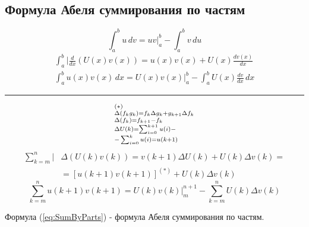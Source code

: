 \documentclass[a4paper,11pt]{article}
\begin{document}
  \subsection {Формула Абеля суммирования по частям}
  \[\int_{a}^{b} u\,dv = uv \bigg|_{a}^{b} - \int_{a}^{b} v\,du\]
  \begin{equation}
    \begin{split}
      \int_{a}^{b} \bigg| \frac{d}{dx}(U(x)v(x)) = u(x)v(x) + U(x)\frac{dv(x)}{dx} \\
      \int_{a}^{b} u(x)v(x)\,dx = U(x)v(x) \bigg|_{a}^{b} - \int_{a}^{b} U(x)\frac{dv}{dx} \,dx
    \end{split}
  \end{equation}
  \hrule
  \marginpar
  {
    \begin{gather*}
      \begin{subarray}{1}
        (*) \\
        \Delta (f_k g_k) = f_k \Delta g_k + g_{k+1} \Delta f_k \\
        \Delta (f_k) = f_{k+1} - f_k \\
        \Delta U(k) = \sum_{i=0}^{k+1} u(i) - \\
        - \sum_{i=0}^{k} u(i) = u(k+1)
      \end{subarray}
    \end{gather*}
  }
  \begin{align*}
    \sum_{k=m}^{n} \bigg| & \Delta(U(k) v(k)) = v(k+1) \Delta U(k) + U(k) \Delta v(k) = \\
    & = [ u(k+1) v(k+1) ]^{(*)} + U(k) \Delta v(k)
  \end{align*}
  \begin{equation}
    \sum_{k=m}^{n} u(k+1) v(k+1) = U(k) v(k) \bigg|_{m}^{n+1} - \sum_{k=m}^{n} U(k) \Delta v(k)
    \label{eq:SumByParts}
  \end{equation}

  Формула (\ref{eq:SumByParts}) - формула Абеля суммирования по частям. \\
\end{document}
